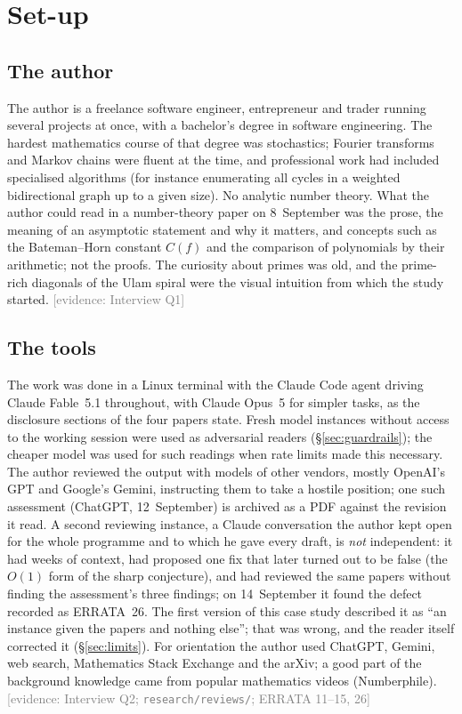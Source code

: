 \documentclass[11pt,a4paper]{article}
\newcommand{\evidence}[1]{{\footnotesize\textcolor{Gray}{[evidence: #1]}}}
\newcommand{\file}[1]{\texttt{#1}}
\begin{document}
\section{Set-up}\label{sec:setup}

\subsection{The author}
The author is a freelance software engineer, entrepreneur and trader running several projects at once, with a
bachelor's degree in software engineering. The hardest mathematics course of that degree was stochastics; Fourier
transforms and Markov chains were fluent at the time, and professional work had included specialised algorithms
(for instance enumerating all cycles in a weighted bidirectional graph up to a given size). No analytic number
theory. What the author could read in a number-theory paper on 8~September was the prose, the meaning of an
asymptotic statement and why it matters, and concepts such as the Bateman--Horn constant $C(f)$ and the comparison of
polynomials by their arithmetic; not the proofs. The curiosity about primes was old, and the prime-rich diagonals of
the Ulam spiral were the visual intuition from which the study started. \evidence{Interview Q1}


\subsection{The tools}
The work was done in a Linux terminal with the Claude Code agent driving Claude Fable~5.1 throughout, with Claude
Opus~5 for simpler tasks, as the disclosure sections of the four papers state. Fresh model instances without access to the working session were used as adversarial readers
(\S\ref{sec:guardrails}); the cheaper model was used for such readings when rate limits made this necessary. The
author reviewed the output with models of other vendors, mostly OpenAI's GPT and Google's Gemini, instructing them
to take a hostile position; one such assessment (ChatGPT, 12~September) is archived as a PDF against the revision
it read. A second reviewing instance, a Claude conversation the author kept open for the whole programme and to
which he gave every draft, is \emph{not} independent: it had weeks of context, had proposed one fix that later turned
out to be false (the $O(1)$ form of the sharp conjecture), and had reviewed the same papers without finding the
assessment's three findings; on 14~September it found the defect recorded as ERRATA~26. The first version of this
case study described it as ``an instance given the papers and nothing else''; that was wrong, and the reader itself
corrected it (\S\ref{sec:limits}). For orientation the author used ChatGPT, Gemini, web search, Mathematics Stack Exchange and the arXiv;
a good part of the background knowledge came from popular mathematics videos (Numberphile).
\evidence{Interview Q2; \file{research/reviews/}; ERRATA 11--15, 26}
\end{document}
